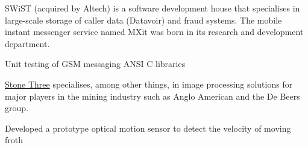 \documentclass[10pt,a4paper,final]{columncv}
\begin{document}
\noindent SWiST (acquired by Altech) is a software development house that specialises in large-scale storage of
caller data (Datavoir) and fraud systems. The mobile instant messenger service named MXit was
born in its research and development department. 
\begin{cvenv}
         {Unit testing of GSM messaging ANSI C libraries}
\end{cvenv}

\noindent \href{http://www.stonethree.com/}{Stone Three} specialises, among other things, in image processing solutions 
for major players in the mining industry such as Anglo American and the De Beers group. 
\begin{cvenv}
         {Developed a prototype optical motion sensor to detect the velocity of moving froth}
\end{cvenv}

\pagebreak

\begin{cvenv}
\end{cvenv}

\begin{cvenv}
\end{cvenv}
\end{document}
